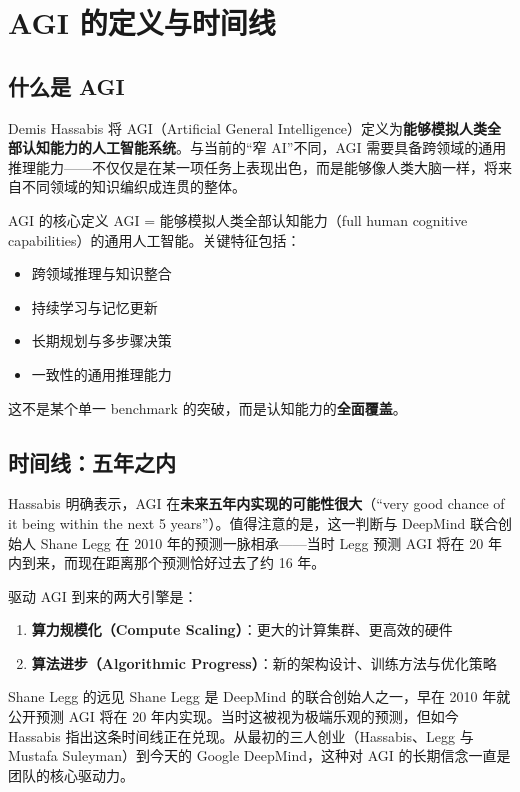 \section{AGI 的定义与时间线}

\subsection{什么是 AGI}

Demis Hassabis 将 AGI（Artificial General Intelligence）定义为\textbf{能够模拟人类全部认知能力的人工智能系统}。与当前的``窄 AI''不同，AGI 需要具备跨领域的通用推理能力——不仅仅是在某一项任务上表现出色，而是能够像人类大脑一样，将来自不同领域的知识编织成连贯的整体。

\begin{importantbox}{AGI 的核心定义}
AGI = 能够模拟人类全部认知能力（full human cognitive capabilities）的通用人工智能。关键特征包括：
\begin{itemize}
    \item 跨领域推理与知识整合
    \item 持续学习与记忆更新
    \item 长期规划与多步骤决策
    \item 一致性的通用推理能力
\end{itemize}
这不是某个单一 benchmark 的突破，而是认知能力的\textbf{全面覆盖}。
\end{importantbox}

\subsection{时间线：五年之内}

Hassabis 明确表示，AGI 在\textbf{未来五年内实现的可能性很大}（``very good chance of it being within the next 5 years''）。值得注意的是，这一判断与 DeepMind 联合创始人 Shane Legg 在 2010 年的预测一脉相承——当时 Legg 预测 AGI 将在 20 年内到来，而现在距离那个预测恰好过去了约 16 年。

驱动 AGI 到来的两大引擎是：
\begin{enumerate}
    \item \textbf{算力规模化（Compute Scaling）}：更大的计算集群、更高效的硬件
    \item \textbf{算法进步（Algorithmic Progress）}：新的架构设计、训练方法与优化策略
\end{enumerate}

\begin{knowledgebox}{Shane Legg 的远见}
Shane Legg 是 DeepMind 的联合创始人之一，早在 2010 年就公开预测 AGI 将在 20 年内实现。当时这被视为极端乐观的预测，但如今 Hassabis 指出这条时间线正在兑现。从最初的三人创业（Hassabis、Legg 与 Mustafa Suleyman）到今天的 Google DeepMind，这种对 AGI 的长期信念一直是团队的核心驱动力。
\end{knowledgebox}

